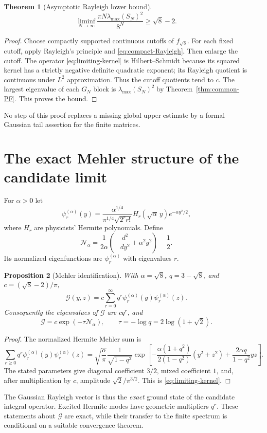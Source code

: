 \documentclass[11pt,reqno]{amsart}
\newtheorem{theorem}{Theorem}[section]
\newtheorem{proposition}[theorem]{Proposition}
\theoremstyle{definition}\newtheorem{definition}[theorem]{Definition}
\theoremstyle{remark}\newtheorem{remark}[theorem]{Remark}
\begin{document}
\begin{theorem}[Asymptotic Rayleigh lower bound]\label{thm:lower-bound}
\begin{equation}\label{eq:lower-bound}
\boxed{\liminf_{N\to\infty}
\frac{\pi N\lambda_{\max}(S_N)^2}{8^N}\ge\sqrt8-2.}
\end{equation}
\end{theorem}
\begin{proof}
Choose compactly supported continuous cutoffs of $f_{\sqrt8}$.
For each fixed cutoff, apply Rayleigh's principle and
\eqref{eq:compact-Rayleigh}. Then enlarge the cutoff.
The operator \eqref{eq:limiting-kernel} is Hilbert--Schmidt because
its squared kernel has a strictly negative definite quadratic exponent;
its Rayleigh quotient is continuous under $L^2$ approximation.
Thus the cutoff quotients tend to $c$. The largest eigenvalue of each
$G_N$ block is $\lambda_{\max}(S_N)^2$ by
Theorem~\ref{thm:common-PF}. This proves the bound.
\end{proof}
No step of this proof replaces a missing global upper estimate by a
formal Gaussian tail assertion for the finite matrices.

\section{The exact Mehler structure of the candidate limit}
For $\alpha>0$ let
\[
\psi_r^{(\alpha)}(y)=
\frac{\alpha^{1/4}}{\pi^{1/4}\sqrt{2^r r!}}
H_r(\sqrt\alpha\,y)e^{-\alpha y^2/2},
\]
where $H_r$ are physicists' Hermite polynomials. Define
\[
\mathcal N_\alpha=
\frac1{2\alpha}\left(-\frac{d^2}{dy^2}+\alpha^2y^2\right)-\frac12.
\]
Its normalized eigenfunctions are $\psi_r^{(\alpha)}$ with eigenvalues $r$.

\begin{proposition}[Mehler identification]\label{prop:Mehler}
With $\alpha=\sqrt8$, $q=3-\sqrt8$, and $c=(\sqrt8-2)/\pi$,
\begin{equation}\label{eq:Mehler-expansion}
\mathcal G(y,z)=c\sum_{r=0}^\infty
q^r\psi_r^{(\alpha)}(y)\psi_r^{(\alpha)}(z).
\end{equation}
Consequently the eigenvalues of $\mathcal G$ are $cq^r$, and
\begin{equation}\label{eq:Mehler-semigroup}
\mathcal G=c\exp(-\tau\mathcal N_\alpha),\qquad
\tau=-\log q=2\log(1+\sqrt2).
\end{equation}
\end{proposition}
\begin{proof}
The normalized Hermite Mehler sum is
\[
\sum_{r\ge0}q^r\psi_r^{(\alpha)}(y)\psi_r^{(\alpha)}(z)
=\sqrt{\frac\alpha\pi}\frac1{\sqrt{1-q^2}}
\exp\left[-\frac{\alpha(1+q^2)}{2(1-q^2)}(y^2+z^2)
+\frac{2\alpha q}{1-q^2}yz\right].
\]
The stated parameters give diagonal coefficient $3/2$, mixed
coefficient $1$, and, after multiplication by $c$, amplitude
$\sqrt2/\pi^{3/2}$. This is \eqref{eq:limiting-kernel}.
\end{proof}
The Gaussian Rayleigh vector is thus the \emph{exact} ground state of
the candidate integral operator. Excited Hermite modes have geometric
multipliers $q^r$. These statements about $\mathcal G$ are exact, while
their transfer to the finite spectrum is conditional on a suitable
convergence theorem.
\end{document}
